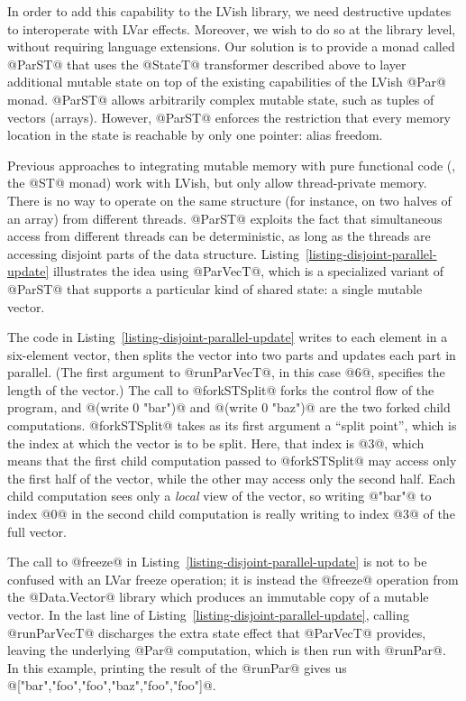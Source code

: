 In order to add this capability to the LVish library, we need
destructive updates to interoperate with LVar effects.  Moreover, we
wish to do so at the library level, without requiring language
extensions.  Our solution is to provide a monad called @ParST@ that
uses the @StateT@ transformer described above to layer additional
mutable state on top of the existing capabilities of the LVish @Par@
monad.  @ParST@ allows arbitrarily complex mutable state, such as
tuples of vectors (arrays).  However, @ParST@ enforces the restriction
that every memory location in the state is reachable by only one
pointer: alias freedom.

Previous approaches to integrating mutable memory with pure functional
code (\ie, the @ST@ monad) work with LVish, but only allow
thread-private memory.  There is no way to operate on the same
structure (for instance, on two halves of an array) from different
threads.  @ParST@ exploits the fact that simultaneous access from
different threads can be deterministic, as long as the threads are
accessing disjoint parts of the data structure.
Listing~\ref{listing-disjoint-parallel-update} illustrates the idea
using @ParVecT@, which is a specialized variant of @ParST@ that
supports a particular kind of shared state: a single mutable vector.

\singlespacing 
\doublespacing

The code in Listing~\ref{listing-disjoint-parallel-update} writes to
each element in a six-element vector, then splits the vector into two
parts and updates each part in parallel.  (The first argument to
@runParVecT@, in this case @6@, specifies the length of the vector.)
The call to @forkSTSplit@ forks the control flow of the program, and
@(write 0 "bar")@ and @(write 0 "baz")@ are the two forked child
computations.  @forkSTSplit@ takes as its first argument a ``split
point'', which is the index at which the vector is to be split.  Here,
that index is @3@, which means that the first child computation passed
to @forkSTSplit@ may access only the first half of the vector, while
the other may access only the second half.  Each child computation
sees only a \emph{local} view of the vector, so writing @"bar"@ to
index @0@ in the second child computation is really writing to index
@3@ of the full vector.

The call to @freeze@ in Listing~\ref{listing-disjoint-parallel-update}
is not to be confused with an LVar freeze operation; it is instead the
@freeze@ operation from the @Data.Vector@ library which produces an
immutable copy of a mutable vector.  In the last line of
Listing~\ref{listing-disjoint-parallel-update}, calling @runParVecT@
discharges the extra state effect that @ParVecT@ provides, leaving the
underlying @Par@ computation, which is then run with @runPar@.  In
this example, printing the result of the @runPar@ gives us
@["bar","foo","foo","baz","foo","foo"]@.

